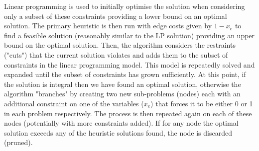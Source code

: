 \documentclass[pdftex,pra,aps,twocolumn,twoside]{revtex4-2}
\theoremstyle{plain}
\theoremstyle{note}
\newcommand\+{{\footnotesize \raisebox{0.3ex}{+}}}
\begin{document}
Linear programming is used to initially optimise the solution when considering only a subset of these constraints providing a lower bound on an optimal solution. The primary heuristic is then run with edge costs given by $1-x_e$ to find a feasible solution (reasonably similar to the LP solution) providing an upper bound on the optimal solution. Then, the algorithm considers the restraints ("cuts") that the current solution violates and adds them to the subset of constraints in the linear programming model. This model is repeatedly solved and expanded until the subset of constraints has grown sufficiently. At this point, if the solution is integral then we have found an optimal solution, otherwise the algorithm "branches" by creating two new sub-problems (nodes) each with an additional constraint on one of the variables ($x_e$) that forces it to be either 0 or 1 in each problem respectively. The process is then repeated again on each of these nodes (potentially with more constraints added). If for any node the optimal solution exceeds any of the heuristic solutions found, the node is discarded (pruned).
\newpage
\end{document}
